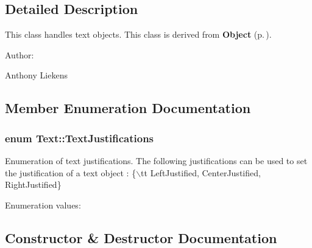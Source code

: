 \subsection{Detailed Description}
This class handles text objects. This class is derived from {\bf Object} {\rm (p.\,\pageref{classObject})}. \begin{Desc}
\item[Author: ]\par
Anthony Liekens \end{Desc}




\subsection{Member Enumeration Documentation}
\subsubsection{\setlength{\rightskip}{0pt plus 5cm}enum Text::Text\-Justifications}\label{classText_s3}


Enumeration of text justifications. The following justifications can be used to set the justification of a text object : \{$\backslash$tt Left\-Justified, Center\-Justified, Right\-Justified\} \begin{Desc}
\item[Enumeration values: ]\par
\begin{description}
\item[{\em 
{\em Left\-Justified}\label{classText_s3s0}
}]\item[{\em 
{\em Center\-Justified}\label{classText_s3s1}
}]\item[{\em 
{\em Right\-Justified}\label{classText_s3s2}
}]\end{description}
\end{Desc}



\subsection{Constructor \& Destructor Documentation}
